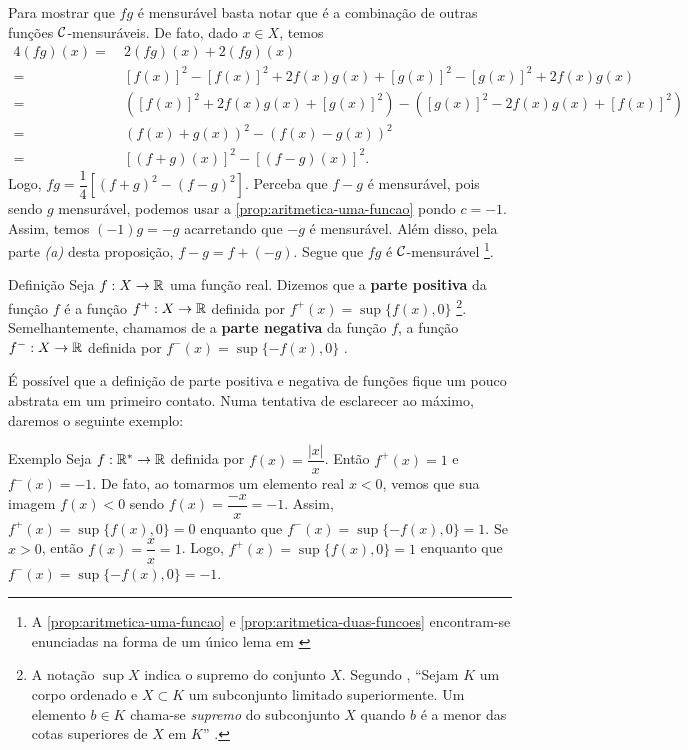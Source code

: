 \begin{prova}
    Para mostrar que $fg$ é mensurável basta notar que é a combinação de outras funções $\operatorname{\mathcal{C}}$-mensuráveis.
    De fato, dado $x \in X$, temos
    	\vspace{-0.2cm}
	    \begin{align*}
	        4(fg)(x) 
	        =& \ 2(fg)(x) +  2(fg)(x)\\
	        =& \ [f(x)]^2 - [f(x)]^2 + 2f(x)g(x) + [g(x)]^2 - [g(x)]^2 + 2f(x)g(x)\\
	        =& \ \left([f(x)]^2 + 2f(x)g(x) + [g(x)]^2\right)  - \left([g(x)]^2 - 2f(x)g(x) + [f(x)]^2\right)\\
	        =& \ (f(x) +g(x))^2 - (f(x) - g(x))^2\\
	        =& \ [(f+g)(x)]^2 - [(f-g)(x)]^2.    
    	\end{align*}
    \vspace{-0.2cm}
    Logo, $fg = \dfrac{1}{4}\left[(f+g)^2 - (f-g)^2\right]$.
    Perceba que  $f-g$ é mensurável, pois sendo $g$ mensurável, podemos usar a \ref{prop:aritmetica-uma-funcao} pondo $c= -1$.
    Assim, temos $(-1)g = -g$ acarretando que $-g$ é mensurável.
    Além disso, pela parte \textit{(a)} desta proposição, $f - g = f+ (-g)$.
    Segue que $fg$ é $\operatorname{\mathcal{C}}$-mensurável
    \footnote{A \ref{prop:aritmetica-uma-funcao} e \ref{prop:aritmetica-duas-funcoes} encontram-se enunciadas na forma de um único lema em \cite[p.9]{bartle}}.
\end{prova}
\begin{env}{Definição}
	\label{def:parte-positiva e negativa}
    Seja $f: X \to \mathbb{R}$ uma função real. 
    Dizemos que a \textbf{parte positiva} da função $f$ é a função $f^+: X \to \mathbb{R}$ definida por $f^+(x) = \sup\{f(x), 0\}$
    \footnote{A notação $\sup X$ indica o supremo do conjunto $X$. 
    	Segundo \citeauthor{elon}, \enquote{Sejam $K$ um corpo ordenado e $X \subset K$ um subconjunto limitado superiormente. 
    	Um elemento $b \in K$ chama-se \textit{supremo} do
    	subconjunto $X$ quando $b$ é a menor das cotas superiores de $X$ em $K$} \cite[p.75]{elon}.  
	}.
    Semelhantemente, chamamos de a \textbf{parte negativa} da função $f$, a função $f^-: X \to \mathbb{R}$ definida por $f^-(x) = \sup\{-f(x), 0\}$
    \cite{bartle}.
\vspace{-0.2cm}\end{env}

É possível  que a definição de parte positiva e negativa de funções fique um pouco abstrata em um primeiro contato. 
Numa tentativa de esclarecer ao máximo, daremos o seguinte exemplo:
\begin{env}{Exemplo}
	\label{ex:parte-positiva e negativa}
    Seja $f: \mathbb{R}^* \to \mathbb{R}$ definida por $f(x) =\dfrac{|x|}{x}$. 
    Então $f^+(x) = 1$ e $f^-(x) = -1$.
    De fato, ao tomarmos um elemento real $x< 0$, vemos que sua imagem $f(x) < 0$ sendo $f(x) = \dfrac{-x}{x} = -1$.
    Assim, $f^+(x) = \sup\{f(x), 0\} = 0$ enquanto que $f^-(x) = \sup\{-f(x), 0\} = 1$.
    Se $x>0$, então $f(x) =\dfrac{x}{x} = 1$. 
    Logo, $f^+(x) = \sup\{f(x), 0\} = 1$ enquanto que $f^-(x) = \sup\{-f(x), 0\} = -1$.
\vspace{-0.2cm}\end{env}

